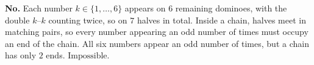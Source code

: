 \textbf{No.} Each number $k\in\{1,\dots,6\}$ appears on $6$ remaining dominoes, with the double $k$--$k$ counting twice, so on $7$ halves in total. Inside a chain, halves meet in matching pairs, so every number appearing an odd number of times must occupy an end of the chain. All six numbers appear an odd number of times, but a chain has only $2$ ends. $\boxed{\text{Impossible}}$.

